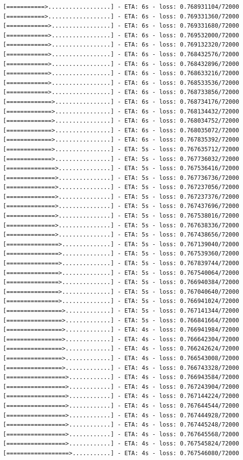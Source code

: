 \documentclass[12pt,fleqn]{article}\usepackage{../../common}
\begin{document}
\begin{verbatim}
[===========>..................] - ETA: 6s - loss: 0.768931104/72000 [===========>..................] - ETA: 6s - loss: 0.769331360/72000 [============>.................] - ETA: 6s - loss: 0.769331680/72000 [============>.................] - ETA: 6s - loss: 0.769532000/72000 [============>.................] - ETA: 6s - loss: 0.769132320/72000 [============>.................] - ETA: 6s - loss: 0.768432576/72000 [============>.................] - ETA: 6s - loss: 0.768432896/72000 [============>.................] - ETA: 6s - loss: 0.768633216/72000 [============>.................] - ETA: 6s - loss: 0.768533536/72000 [============>.................] - ETA: 6s - loss: 0.768733856/72000 [=============>................] - ETA: 6s - loss: 0.768734176/72000 [=============>................] - ETA: 6s - loss: 0.768134432/72000 [=============>................] - ETA: 6s - loss: 0.768034752/72000 [=============>................] - ETA: 6s - loss: 0.768035072/72000 [=============>................] - ETA: 6s - loss: 0.767835392/72000 [=============>................] - ETA: 5s - loss: 0.767635712/72000 [=============>................] - ETA: 5s - loss: 0.767736032/72000 [==============>...............] - ETA: 5s - loss: 0.767536416/72000 [==============>...............] - ETA: 5s - loss: 0.767736736/72000 [==============>...............] - ETA: 5s - loss: 0.767237056/72000 [==============>...............] - ETA: 5s - loss: 0.767237376/72000 [==============>...............] - ETA: 5s - loss: 0.767437696/72000 [==============>...............] - ETA: 5s - loss: 0.767538016/72000 [==============>...............] - ETA: 5s - loss: 0.767638336/72000 [==============>...............] - ETA: 5s - loss: 0.767438656/72000 [===============>..............] - ETA: 5s - loss: 0.767139040/72000 [===============>..............] - ETA: 5s - loss: 0.767539360/72000 [===============>..............] - ETA: 5s - loss: 0.767839744/72000 [===============>..............] - ETA: 5s - loss: 0.767540064/72000 [===============>..............] - ETA: 5s - loss: 0.766940384/72000 [===============>..............] - ETA: 5s - loss: 0.767040640/72000 [===============>..............] - ETA: 5s - loss: 0.766941024/72000 [================>.............] - ETA: 5s - loss: 0.767141344/72000 [================>.............] - ETA: 5s - loss: 0.766841664/72000 [================>.............] - ETA: 4s - loss: 0.766941984/72000 [================>.............] - ETA: 4s - loss: 0.766642304/72000 [================>.............] - ETA: 4s - loss: 0.766242624/72000 [================>.............] - ETA: 4s - loss: 0.766543008/72000 [================>.............] - ETA: 4s - loss: 0.766743328/72000 [=================>............] - ETA: 4s - loss: 0.766943584/72000 [=================>............] - ETA: 4s - loss: 0.767243904/72000 [=================>............] - ETA: 4s - loss: 0.767144224/72000 [=================>............] - ETA: 4s - loss: 0.767644544/72000 [=================>............] - ETA: 4s - loss: 0.767444928/72000 [=================>............] - ETA: 4s - loss: 0.767445248/72000 [=================>............] - ETA: 4s - loss: 0.767645568/72000 [=================>............] - ETA: 4s - loss: 0.767545824/72000 [==================>...........] - ETA: 4s - loss: 0.767546080/72000 
\end{verbatim}
\end{document}
